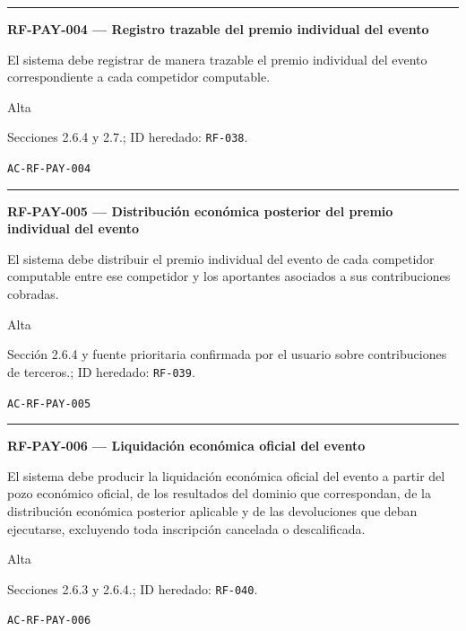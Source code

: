 \documentclass[10pt,letterpaper]{article}
\begin{document}
\vspace{0.25em}\hrule\vspace{0.65em}
\noindent\textbf{RF-PAY-004 --- Registro trazable del premio individual del evento}\par
\begin{description}[style=nextline,leftmargin=3.15cm,labelwidth=2.8cm,font=\normalfont\bfseries]
\item[Obligación] El sistema debe registrar de manera trazable el premio individual del evento correspondiente a cada competidor computable.
\item[Prioridad] Alta
\item[Procedencia] Secciones 2.6.4 y 2.7.; ID heredado: \texttt{RF-038}.
\item[Verificación] \texttt{AC-RF-PAY-004}
\end{description}
\vspace{0.25em}\hrule\vspace{0.65em}
\noindent\textbf{RF-PAY-005 --- Distribución económica posterior del premio individual del evento}\par
\begin{description}[style=nextline,leftmargin=3.15cm,labelwidth=2.8cm,font=\normalfont\bfseries]
\item[Obligación] El sistema debe distribuir el premio individual del evento de cada competidor computable entre ese competidor y los aportantes asociados a sus contribuciones cobradas.
\item[Prioridad] Alta
\item[Procedencia] Sección 2.6.4 y fuente prioritaria confirmada por el usuario sobre contribuciones de terceros.; ID heredado: \texttt{RF-039}.
\item[Verificación] \texttt{AC-RF-PAY-005}
\end{description}
\vspace{0.25em}\hrule\vspace{0.65em}
\noindent\textbf{RF-PAY-006 --- Liquidación económica oficial del evento}\par
\begin{description}[style=nextline,leftmargin=3.15cm,labelwidth=2.8cm,font=\normalfont\bfseries]
\item[Obligación] El sistema debe producir la liquidación económica oficial del evento a partir del pozo económico oficial, de los resultados del dominio que correspondan, de la distribución económica posterior aplicable y de las devoluciones que deban ejecutarse, excluyendo toda inscripción cancelada o descalificada.
\item[Prioridad] Alta
\item[Procedencia] Secciones 2.6.3 y 2.6.4.; ID heredado: \texttt{RF-040}.
\item[Verificación] \texttt{AC-RF-PAY-006}
\end{description}
\end{document}
